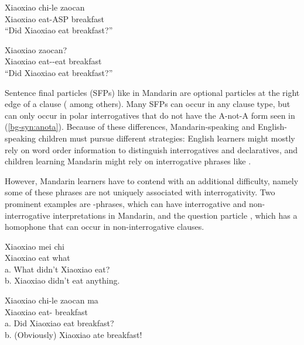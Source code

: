 \vspace{-2ex} 
\noindent
\begin{minipage}[t]{0.45\linewidth}	
\gll Xiaoxiao	chi-le	zaocan		\\
Xiaoxiao	eat-ASP	breakfast	\Sfp{}\\
``Did Xiaoxiao eat breakfast?''
\eex
\end{minipage}
\hspace{0.5cm} %
\begin{minipage}[t]{0.5\linewidth} 
\gll Xiaoxiao		zaocan?\\
	Xiaoxiao	eat-\Neg-eat	breakfast\\
	``Did Xiaoxiao eat breakfast?''
\eex
\end{minipage}
\vspace{1ex}

\noindent Sentence final particles (SFPs) like \ma{} in Mandarin are optional particles at the right edge of a clause (\citealt{chao1968, zhudexi, huang1982, cheng1991, liboya2006} among others). Many SFPs can occur in any clause type, but \ma{} can only occur in polar interrogatives that do not have the A-not-A form seen in (\ref{bg-syn:anota}). Because of these differences, Mandarin-speaking and English-speaking children must pursue different strategies: English learners might mostly rely on word order information to distinguish interrogatives and declaratives, and children learning Mandarin might rely on interrogative phrases like . 

However, Mandarin learners have to contend with an additional difficulty, namely some of these phrases are not uniquely associated with interrogativity. Two prominent examples are \twh-phrases, which can have interrogative and non-interrogative interpretations in Mandarin, and the question particle \ma, which has a homophone that can occur in non-interrogative clauses.

\vspace{-2ex}
\noindent 
\begin{minipage}[t]{0.45\linewidth}	
\gll Xiaoxiao	mei	chi	\\
Xiaoxiao	\Neg{}	eat	what\\
a.	What didn't Xiaoxiao eat?\\
b.	Xiaoxiao didn't eat anything.\\
\eex
\end{minipage}
\hspace{0.5cm} %
\begin{minipage}[t]{0.5\linewidth} 
\gll Xiaoxiao	chi-le		zaocan		ma\\
	Xiaoxiao	eat-\Asp{}	breakfast	\Sfp{}\\
a.	Did Xiaoxiao eat breakfast?\\
b.	(Obviously) Xiaoxiao ate breakfast!\\
\eex
\end{minipage}
\vspace{-1.5ex}

